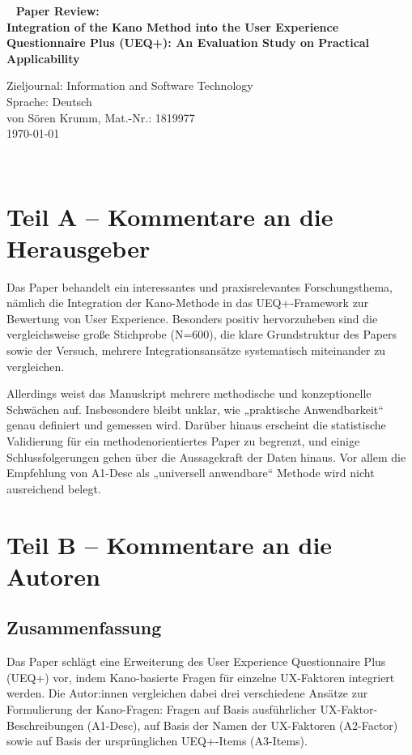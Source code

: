 \documentclass[12pt,DIV=14, version=first, BCOR=10mm,a4paper,twoside,parskip=half-,headsepline,headinclude]{scrartcl}
\begin{document}
\thispagestyle{empty}
   {  ~ \sffamily
  \vfill
  {\Huge\bfseries Paper Review: \\
  Integration of the Kano Method into the User
Experience Questionnaire Plus (UEQ+): An
Evaluation Study on Practical Applicability}
  \bigskip

  {\Large
 Zieljournal: Information and Software Technology \\[2ex]
 Sprache: Deutsch  \\[2ex]
 von Sören Krumm, Mat.-Nr.: 1819977 
 \\[5ex]
   \today }
}
 \vfill

  ~ \hfill


\vspace*{-3cm}
\newpage
\section{Teil A – Kommentare an die Herausgeber}
Das Paper behandelt ein interessantes und praxisrelevantes Forschungsthema, nämlich die Integration der Kano-Methode in das UEQ+-Framework zur Bewertung von User Experience. Besonders positiv hervorzuheben sind die vergleichsweise große Stichprobe (N=600), die klare Grundstruktur des Papers sowie der Versuch, mehrere Integrationsansätze systematisch miteinander zu vergleichen.

Allerdings weist das Manuskript mehrere methodische und konzeptionelle Schwächen auf. Insbesondere bleibt unklar, wie „praktische Anwendbarkeit“ genau definiert und gemessen wird. Darüber hinaus erscheint die statistische Validierung für ein methodenorientiertes Paper zu begrenzt, und einige Schlussfolgerungen gehen über die Aussagekraft der Daten hinaus. Vor allem die Empfehlung von A1-Desc als „universell anwendbare“ Methode wird nicht ausreichend belegt.
\section{Teil B – Kommentare an die Autoren}
\subsection{Zusammenfassung}

Das Paper schlägt eine Erweiterung des User Experience Questionnaire Plus (UEQ+) vor, indem Kano-basierte Fragen für einzelne UX-Faktoren integriert werden. Die Autor:innen vergleichen dabei drei verschiedene Ansätze zur Formulierung der Kano-Fragen: Fragen auf Basis ausführlicher UX-Faktor-Beschreibungen (A1-Desc), auf Basis der Namen der UX-Faktoren (A2-Factor) sowie auf Basis der ursprünglichen UEQ+-Items (A3-Items).
\end{document}
